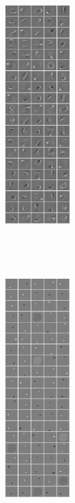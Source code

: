 \documentclass{article} %
\begin{document}
\begin{figure}
\centering 
\begin{subfigure}[b]{0.225\textwidth}
		\centering 
		\includegraphics[width=2.5cm, height=10cm]{./Figures/strokes_full.png}
		\caption{}
	\end{subfigure} 
	\begin{subfigure}[b]{0.225\textwidth}
		\centering 
		\includegraphics[width=2.5cm, height=10cm]{./Figures/MNIST_sat_linear_full.png}
		\caption{}
	\end{subfigure} 
	\begin{subfigure}[b]{0.2\textwidth}
		\centering 

\end{subfigure}
\end{figure}
\end{document}
